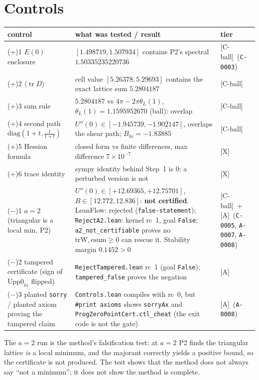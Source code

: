 \documentclass[10pt]{article}
\newcommand{\tier}[1]{\textsf{[#1]}}
\newcommand{\tA}{\tier{A}}
\newcommand{\tX}{\tier{X}}
\newcommand{\tCb}{\textcolor{blue!60!black}{\textsf{[C-ball]}}}
\newcommand{\lean}[1]{\texttt{#1}}
\newcommand{\tr}{\operatorname{tr}}
\begin{document}
\section{Controls}\label{sec:controls}
\begin{center}\small\begin{tabular}{p{4.0cm}p{6.4cm}p{3.8cm}}\toprule
control & what was tested / result & tier\\\midrule
(+)1 $E(0)$ enclosure & $[1.498719,1.507934]$ contains P2's spectral $1.50335235220736$ & \tCb\ (\texttt{C-0003})\\
(+)2 $\langle\tr D\rangle$ & cell value $[5.26378,5.29693]$ contains the exact lattice sum $5.2804187$ & \tCb\\
(+)3 sum rule & $5.2804187$ vs $4\pi-2\pi\theta_L(1)$, $\theta_L(1)=1.1595952670$ (ball): overlap & \tCb\\
(+)4 second path $\mathrm{diag}(1{+}t,\tfrac1{1+t})$ & $U''(0)\in[-1.945739,-1.902147]$, overlaps the shear path; $B_{hi}=-1.83885$ & \tCb\\
(+)5 Hessian formula & closed form vs finite differences, max difference $7\times10^{-7}$ & \tX\\
(+)6 trace identity & sympy identity behind Step~1 is $0$; a perturbed version is not & \tX\\
($-$)1 $a=2$ (triangular is a local min, P2) & $U''(0)\in[+12.69365,+12.75701]$, $B\in[12.772,12.836]$: \textbf{not certified}. LeanFlow: rejected (\texttt{false-statement}); \lean{RejectA2.lean}: kernel rc~1, goal \lean{False}; \lean{a2\_not\_certifiable} proves no $\mathrm{trW},\mathrm{esum}\ge0$ can rescue it. Stability margin $0.1452>0$ & \tCb\ + \tA\ (\texttt{C-0005}, \texttt{A-0007}, \texttt{A-0008})\\
($-$)2 tampered certificate (sign of $\mathrm{Upp0}_{hi}$ flipped) & \lean{RejectTampered.lean} rc~1 (goal \lean{False}); \lean{tampered\_false} proves the negation & \tA\\
($-$)3 planted \lean{sorry} / planted axiom proving the tampered claim & \lean{Controls.lean} compiles with rc~0, but \lean{\#print axioms} shows \lean{sorryAx} and \lean{ProgZeroPointCert.ctl\_cheat} (the exit code is not the gate) & \tA\ (\texttt{A-0008})\\
\bottomrule\end{tabular}\end{center}
The $a=2$ run is the method's falsification test: at $a=2$ P2 finds the triangular lattice \emph{is} a local minimum, and the majorant correctly yields a positive bound, so the certificate is not produced. The test shows that the method does not always say ``not a minimum''; it does not show the method is complete.
\end{document}
